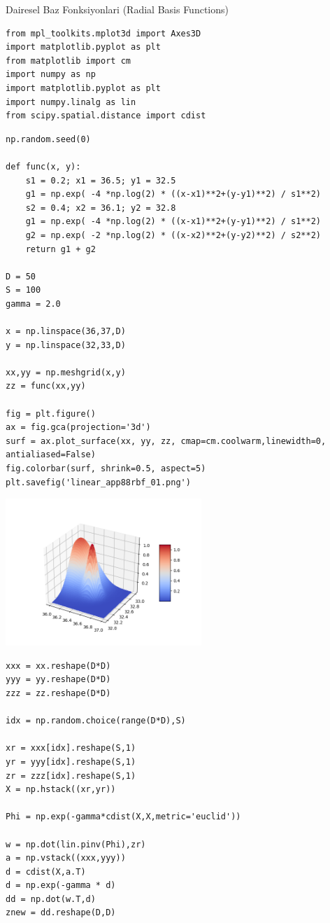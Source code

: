 \documentclass[12pt,fleqn]{article}\usepackage{../../common}
\begin{document}
Dairesel Baz Fonksiyonlari (Radial Basis Functions)

\begin{verbatim}
from mpl_toolkits.mplot3d import Axes3D
import matplotlib.pyplot as plt
from matplotlib import cm
import numpy as np
import matplotlib.pyplot as plt
import numpy.linalg as lin
from scipy.spatial.distance import cdist
\end{verbatim}

\begin{verbatim}
np.random.seed(0)

def func(x, y):
    s1 = 0.2; x1 = 36.5; y1 = 32.5
    g1 = np.exp( -4 *np.log(2) * ((x-x1)**2+(y-y1)**2) / s1**2)
    s2 = 0.4; x2 = 36.1; y2 = 32.8
    g1 = np.exp( -4 *np.log(2) * ((x-x1)**2+(y-y1)**2) / s1**2)
    g2 = np.exp( -2 *np.log(2) * ((x-x2)**2+(y-y2)**2) / s2**2)    
    return g1 + g2 

D = 50
S = 100
gamma = 2.0

x = np.linspace(36,37,D)
y = np.linspace(32,33,D)

xx,yy = np.meshgrid(x,y)
zz = func(xx,yy)

fig = plt.figure()
ax = fig.gca(projection='3d')
surf = ax.plot_surface(xx, yy, zz, cmap=cm.coolwarm,linewidth=0, antialiased=False)
fig.colorbar(surf, shrink=0.5, aspect=5)
plt.savefig('linear_app88rbf_01.png')
\end{verbatim}

\includegraphics[width=20em]{linear_app88rbf_01.png}

\begin{verbatim}
xxx = xx.reshape(D*D)
yyy = yy.reshape(D*D)
zzz = zz.reshape(D*D)

idx = np.random.choice(range(D*D),S)

xr = xxx[idx].reshape(S,1)
yr = yyy[idx].reshape(S,1)
zr = zzz[idx].reshape(S,1)
X = np.hstack((xr,yr))

Phi = np.exp(-gamma*cdist(X,X,metric='euclid'))

w = np.dot(lin.pinv(Phi),zr)
a = np.vstack((xxx,yyy))
d = cdist(X,a.T)
d = np.exp(-gamma * d)
dd = np.dot(w.T,d)
znew = dd.reshape(D,D)
\end{verbatim}
\end{document}
